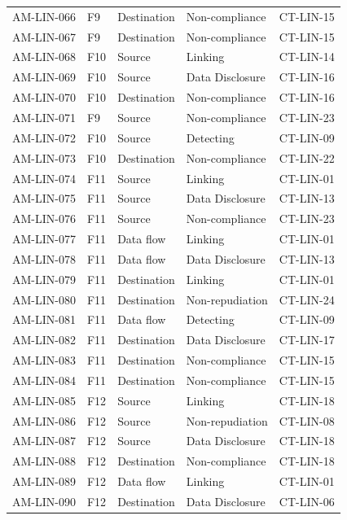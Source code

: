 \begin{footnotesize}
\begin{longtable}{l l p{} p{} l}
        AM-LIN-066 & F9 & Destination & Non-compliance & CT-LIN-15 \\
        AM-LIN-067 & F9 & Destination & Non-compliance & CT-LIN-15 \\
        AM-LIN-068 & F10 & Source & Linking & CT-LIN-14 \\
        AM-LIN-069 & F10 & Source & Data Disclosure & CT-LIN-16 \\
        AM-LIN-070 & F10 & Destination & Non-compliance & CT-LIN-16 \\
        AM-LIN-071 & F9 & Source & Non-compliance & CT-LIN-23 \\
        AM-LIN-072 & F10 & Source & Detecting & CT-LIN-09 \\
        AM-LIN-073 & F10 & Destination & Non-compliance & CT-LIN-22 \\
        AM-LIN-074 & F11 & Source & Linking & CT-LIN-01 \\
        AM-LIN-075 & F11 & Source & Data Disclosure & CT-LIN-13 \\
        AM-LIN-076 & F11 & Source & Non-compliance & CT-LIN-23 \\
        AM-LIN-077 & F11 & Data flow & Linking & CT-LIN-01 \\
        AM-LIN-078 & F11 & Data flow & Data Disclosure & CT-LIN-13 \\
        AM-LIN-079 & F11 & Destination & Linking & CT-LIN-01 \\
        AM-LIN-080 & F11 & Destination & Non-repudiation & CT-LIN-24 \\
        AM-LIN-081 & F11 & Data flow & Detecting & CT-LIN-09 \\
        AM-LIN-082 & F11 & Destination & Data Disclosure & CT-LIN-17 \\
        AM-LIN-083 & F11 & Destination & Non-compliance & CT-LIN-15 \\
        AM-LIN-084 & F11 & Destination & Non-compliance & CT-LIN-15 \\
        AM-LIN-085 & F12 & Source & Linking & CT-LIN-18 \\
        AM-LIN-086 & F12 & Source & Non-repudiation & CT-LIN-08 \\
        AM-LIN-087 & F12 & Source & Data Disclosure & CT-LIN-18 \\
        AM-LIN-088 & F12 & Destination & Non-compliance & CT-LIN-18 \\
        AM-LIN-089 & F12 & Data flow & Linking & CT-LIN-01 \\
        AM-LIN-090 & F12 & Destination & Data Disclosure & CT-LIN-06 \\

\end{longtable}
\end{footnotesize}
